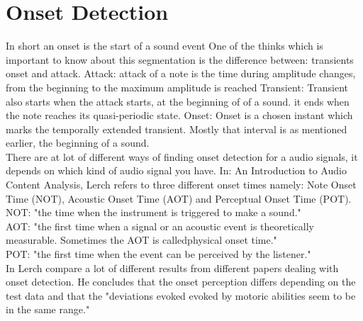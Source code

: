 \section{Onset Detection}
In short an onset is the start of a sound event \citep{ACA} 
One of the thinks which is important to know about this segmentation is the difference between: transients onset and attack. 
Attack: attack of a note is the time during amplitude changes, from the beginning to the maximum amplitude is reached \citep{ACA}
Transient: Transient also starts when the attack starts, at the beginning of of a sound. it ends when the note reaches its quasi-periodic state. \citep{ACA}
Onset: Onset is a chosen instant which marks the temporally extended transient. \citep{Bello2005} Mostly that interval is as mentioned earlier, the beginning of a sound. 
\\
There are at lot of different ways of finding onset detection for a audio signals, it depends on which kind of audio signal you have.
In: An Introduction to Audio Content Analysis, \citep{ACA} Lerch refers to three different onset times namely: Note Onset Time (NOT), Acoustic Onset Time (AOT) and Perceptual Onset Time (POT).
\\
NOT: "the time when the instrument is triggered to make a sound." \citep{ACA}
\\
AOT: "the first time when a signal or an acoustic event is theoretically measurable. Sometimes the AOT is calledphysical onset time." \citep{ACA}
\\
POT: "the first time when the event can be perceived by the
listener." \citep{ACA}
\\
In \citep{ACA} Lerch compare a lot of different results from different papers dealing with onset detection. He concludes that the onset perception differs depending on the test data and that the "deviations evoked evoked by motoric abilities seem to be in the same range." \citep{ACA}